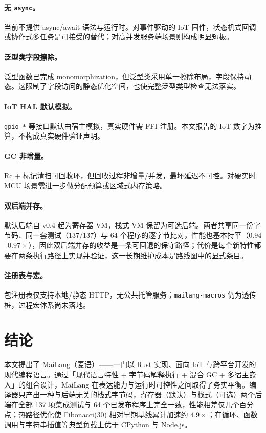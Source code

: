 \documentclass[10pt,a4paper]{article}
\begin{document}
\paragraph{无 \texttt{async}。}
当前不提供 async/await 语法与运行时。对事件驱动的 IoT 固件，状态机式回调或协作式多任务是可接受的替代；对高并发服务端场景则构成明显短板。

\paragraph{泛型类字段擦除。}
泛型函数已完成 monomorphization，但泛型类采用单一擦除布局，字段保持动态。这限制了字段访问的静态优化空间，也使完整泛型类型检查无法落实。

\paragraph{IoT HAL 默认模拟。}
\texttt{gpio\_*} 等接口默认由宿主模拟，真实硬件需 FFI 注册。本文报告的 IoT 数字为推算，不构成真实硬件验证声明。

\paragraph{GC 非增量。}
Rc + 标记清扫可回收环，但回收过程非增量/并发，最坏延迟不可控。对硬实时 MCU 场景需进一步做分配预算或区域式内存策略。

\paragraph{双后端并存。}
默认后端自 v0.4 起为寄存器 VM，栈式 VM 保留为可选后端。两者共享同一份字节码、同一套测试（137/137）与 64 个程序的逐字节比对，性能也基本持平（$0.94$--$0.97\times$），因此双后端并存的收益是一条可回退的保守路径；代价是每个新特性都要在两条执行路径上实现并验证，这一长期维护成本是路线图中的显式条目。

\paragraph{注册表与宏。}
包注册表仅支持本地/静态 HTTP，无公共托管服务；\texttt{mailang-macros} 仍为透传桩，过程宏体系尚未落地。

\section{结论}
\label{sec:concl}

本文提出了 MaìLang（麦语）——一门以 Rust 实现、面向 IoT 与跨平台开发的现代编程语言。通过「现代语言特性 + 字节码解释执行 + 混合 GC + 多宿主嵌入」的组合设计，MaìLang 在表达能力与运行时可控性之间取得了务实平衡。编译器只产出一种与后端无关的栈式字节码，寄存器（默认）与栈式（可选）两个后端在全部 137 项集成测试与 64 个已发布程序上完全一致，性能相差仅几个百分点；热路径优化使 Fibonacci(30) 相对早期基线累计加速约 $4.9\times$；在循环、函数调用与字符串插值等典型负载上优于 CPython 与 Node.js。
\end{document}
